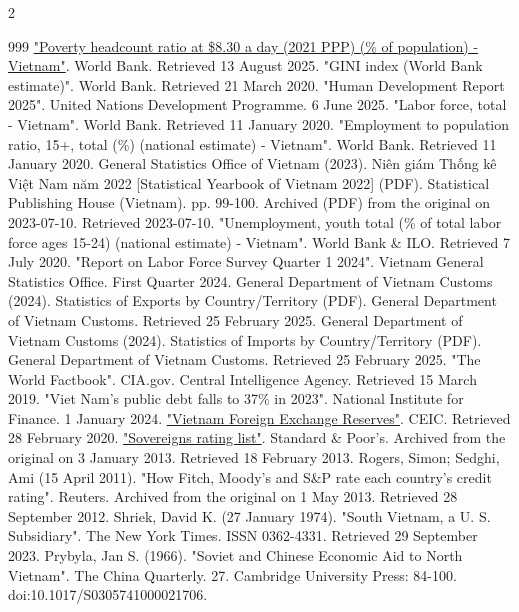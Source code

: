 \documentclass[openany]{book}
\begin{document}
\begin{multicols}{2}
\begin{thebibliography}{999}
 \href{https://data.worldbank.org/indicator/SI.POV.UMIC?locations=VN}{"Poverty headcount ratio at \$8.30 a day (2021 PPP) (\% of population) - Vietnam"}. World Bank. Retrieved 13 August 2025.
 "GINI index (World Bank estimate)". World Bank. Retrieved 21 March 2020.
 "Human Development Report 2025". United Nations Development Programme. 6 June 2025.
 "Labor force, total - Vietnam". World Bank. Retrieved 11 January 2020.
 "Employment to population ratio, 15+, total (\%) (national estimate) - Vietnam". World Bank. Retrieved 11 January 2020.
 General Statistics Office of Vietnam (2023). Niên giám Thống kê Việt Nam năm 2022 [Statistical Yearbook of Vietnam 2022] (PDF). Statistical Publishing House (Vietnam). pp. 99-100. Archived (PDF) from the original on 2023-07-10. Retrieved 2023-07-10.
 "Unemployment, youth total (\% of total labor force ages 15-24) (national estimate) - Vietnam". World Bank \& ILO. Retrieved 7 July 2020.
 "Report on Labor Force Survey Quarter 1 2024". Vietnam General Statistics Office. First Quarter 2024.
 General Department of Vietnam Customs (2024). Statistics of Exports by Country/Territory (PDF). General Department of Vietnam Customs. Retrieved 25 February 2025.
 General Department of Vietnam Customs (2024). Statistics of Imports by Country/Territory (PDF). General Department of Vietnam Customs. Retrieved 25 February 2025.
 "The World Factbook". CIA.gov. Central Intelligence Agency. Retrieved 15 March 2019.
 "Viet Nam's public debt falls to 37\% in 2023". National Institute for Finance. 1 January 2024.
 \href{https://www.ceicdata.com/en/indicator/vietnam/foreign-exchange-reserves}{"Vietnam Foreign Exchange Reserves"}. CEIC. Retrieved 28 February 2020.
 \href{https://web.archive.org/web/20130103142249/http://www.standardandpoors.com/ratings/sovereigns/ratings-list/en/us?sectorName=null&subSectorCode=&filter=V}{"Sovereigns rating list"}. Standard \& Poor's. Archived from the original on 3 January 2013. Retrieved 18 February 2013.
 Rogers, Simon; Sedghi, Ami (15 April 2011). "How Fitch, Moody's and S\&P rate each country's credit rating". Reuters. Archived from the original on 1 May 2013. Retrieved 28 September 2012.
 Shriek, David K. (27 January 1974). "South Vietnam, a U. S. Subsidiary". The New York Times. ISSN 0362-4331. Retrieved 29 September 2023.
 Prybyla, Jan S. (1966). "Soviet and Chinese Economic Aid to North Vietnam". The China Quarterly. 27. Cambridge University Press: 84-100. doi:10.1017/S0305741000021706.

\end{thebibliography}
\end{multicols}
\end{document}

